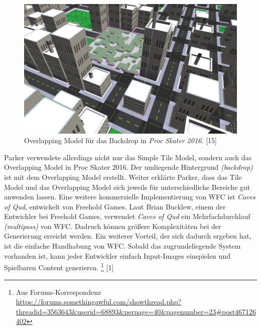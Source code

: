 \documentclass[12pt, a4paper,twoside,openright]{report}
\begin{document}
\begin{figure}
    \includegraphics[width=1\linewidth]{images/proc-skate-backdrop.png}%
    \caption{Overlapping Model für das Backdrop in \textit{Proc Skater 2016.} {[15]}}%
\end{figure}

Parker verwendete allerdings nicht nur das Simple Tile Model, sondern auch das Overlapping Model in Proc Skater 2016.
Der umliegende Hintergrund \textit{(backdrop)} ist mit dem Overlapping Model erstellt.
Weiter erklärte Parker, dass das Tile Model und das Overlapping Model sich jeweils für unterschiedliche Bereiche gut anwenden lassen.
\newline
Eine weitere kommerzielle Implementierung von WFC ist \textit{Caves of Qud}, entwickelt von Freehold Games.
Laut Brian Bucklew, einem der Entwickler bei Freehold Games, verwendet \textit{Caves of Qud} ein Mehrfachdurchlauf \textit{(multipass)} von WFC.
Dadruch können größere Komplexitäten bei der Generierung erreicht werden.
Ein weiterer Vorteil, der sich dadurch ergeben hat, ist die einfache Handhabung von WFC.
Sobald das zugrundeliegende System vorhanden ist, kann jeder Entwickler einfach Input-Images einspielen und Spielbaren Content generieren.
\footnote[5]{Aus Forums-Korrespondenz \url{https://forums.somethingawful.com/showthread.php?threadid=3563643&userid=68893&perpage=40&pagenumber=23\#post467126402}} {[1]}
\end{document}
